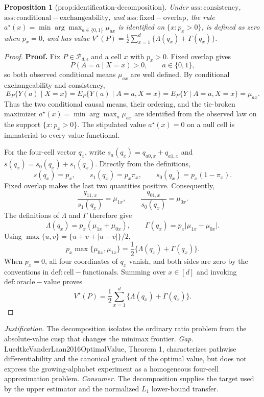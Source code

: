 \documentclass{article}
\newtheorem{proposition}{Proposition}
\begin{document}
\begin{proposition}[prop:identification-decomposition]\label{prop:identification-decomposition}
Under \(\mathrm{ass:consistency}\), \(\mathrm{ass:conditional-exchangeability}\), and \(\mathrm{ass:fixed-overlap}\), the rule \(a^\star(x)=\min\arg\max_{a\in\{0,1\}}\mu_{ax}\) is identified on \(\{x:p_x>0\}\), is defined as zero when \(p_x=0\), and has value \(V^\star(P)=\frac12\sum_{x=1}^d\{\Lambda(q_x)+\Gamma(q_x)\}\).
\end{proposition}
\begin{proof}
\textbf{Proof.}
Fix \(P\in\mathcal P_{d,\epsilon}\) and a cell \(x\) with \(p_x>0\).  Fixed overlap gives
\[
 P(A=a\mid X=x)>0,
 \qquad a\in\{0,1\},
\]
so both observed conditional means \(\mu_{ax}\) are well defined.  By conditional exchangeability and consistency,
\[
 E_P\{Y(a)\mid X=x\}
 =E_P\{Y(a)\mid A=a,X=x\}
 =E_P\{Y\mid A=a,X=x\}
 =\mu_{ax}.
\]
Thus the two conditional causal means, their ordering, and the tie-broken maximizer
\(a^\star(x)=\min\arg\max_a\mu_{ax}\) are identified from the observed law on the support \(\{x:p_x>0\}\).  The stipulated value \(a^\star(x)=0\) on a null cell is immaterial to every value functional.

For the four-cell vector \(q_x\), write \(s_a(q_x)=q_{a0,x}+q_{a1,x}\) and \(s(q_x)=s_0(q_x)+s_1(q_x)\).  Directly from the definitions,
\[
 s(q_x)=p_x,
 \qquad s_1(q_x)=p_x\pi_x,
 \qquad s_0(q_x)=p_x(1-\pi_x).
\]
Fixed overlap makes the last two quantities positive.  Consequently,
\[
 \frac{q_{11,x}}{s_1(q_x)}=\mu_{1x},
 \qquad
 \frac{q_{01,x}}{s_0(q_x)}=\mu_{0x}.
\]
The definitions of \(\Lambda\) and \(\Gamma\) therefore give
\[
 \Lambda(q_x)=p_x(\mu_{1x}+\mu_{0x}),
 \qquad
 \Gamma(q_x)=p_x\lvert\mu_{1x}-\mu_{0x}\rvert.
\]
Using \(\max\{u,v\}=\{u+v+\lvert u-v\rvert\}/2\),
\[
 p_x\max\{\mu_{0x},\mu_{1x}\}
 =\frac12\{\Lambda(q_x)+\Gamma(q_x)\}.
\]
When \(p_x=0\), all four coordinates of \(q_x\) vanish, and both sides are zero by the conventions in \(\mathrm{def:cell-functionals}\).  Summing over \(x\in[d]\) and invoking \(\mathrm{def:oracle-value}\) proves
\[
 V^\star(P)=\frac12\sum_{x=1}^d\{\Lambda(q_x)+\Gamma(q_x)\}.
\]
\end{proof}
\par\smallskip\noindent \textit{Justification.} The decomposition isolates the ordinary ratio problem from the absolute-value cusp that changes the minimax frontier. \textit{Gap.} LuedtkeVanderLaan2016OptimalValue, Theorem 1, characterizes pathwise differentiability and the canonical gradient of the optimal value, but does not express the growing-alphabet experiment as a homogeneous four-cell approximation problem. \textit{Consumer.} The decomposition supplies the target used by the upper estimator and the normalized \(L_1\) lower-bound transfer.
\end{document}

